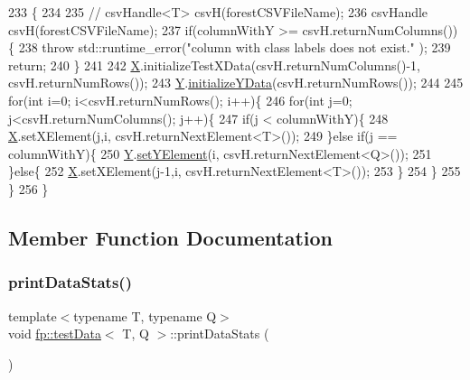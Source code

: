 \begin{DoxyCode}
233         \{
234 
235             \textcolor{comment}{//          csvHandle<T> csvH(forestCSVFileName);}
236             csvHandle csvH(forestCSVFileName);
237             \textcolor{keywordflow}{if}(columnWithY >= csvH.returnNumColumns())\{
238                 \textcolor{keywordflow}{throw} std::runtime\_error(\textcolor{stringliteral}{"column with class labels does not exist."} );
239                 \textcolor{keywordflow}{return};
240             \}
241 
242             \hyperlink{classfp_1_1testData_ad85120d23de2f6c10d6e9455e5f5adb9}{X}.initializeTestXData(csvH.returnNumColumns()-1, csvH.returnNumRows());
243             \hyperlink{classfp_1_1testData_a9421a63841491860ddeeb1f7fa0d4219}{Y}.\hyperlink{classfp_1_1inputYData_a9bb60b2b0070ae39ad53088f1bcf9e87}{initializeYData}(csvH.returnNumRows());
244 
245             \textcolor{keywordflow}{for}(\textcolor{keywordtype}{int} i=0; i<csvH.returnNumRows(); i++)\{
246                 \textcolor{keywordflow}{for}(\textcolor{keywordtype}{int} j=0; j<csvH.returnNumColumns(); j++)\{
247                     \textcolor{keywordflow}{if}(j < columnWithY)\{
248                         \hyperlink{classfp_1_1testData_ad85120d23de2f6c10d6e9455e5f5adb9}{X}.setXElement(j,i, csvH.returnNextElement<T>());
249                     \}\textcolor{keywordflow}{else} \textcolor{keywordflow}{if}(j == columnWithY)\{
250                         \hyperlink{classfp_1_1testData_a9421a63841491860ddeeb1f7fa0d4219}{Y}.\hyperlink{classfp_1_1inputYDataClassification_a421b4107615668eebf7bf447fb99ecc5}{setYElement}(i, csvH.returnNextElement<Q>());
251                     \}\textcolor{keywordflow}{else}\{
252                         \hyperlink{classfp_1_1testData_ad85120d23de2f6c10d6e9455e5f5adb9}{X}.setXElement(j-1,i, csvH.returnNextElement<T>());
253                     \}
254                 \}
255             \}
256         \}
\end{DoxyCode}


\subsection{Member Function Documentation}
\mbox{\label{classfp_1_1testData_ae9f03130f5c189e7469ac634a2e897c5}} 
\subsubsection{\texorpdfstring{print\+Data\+Stats()}{printDataStats()}}
{\footnotesize\ttfamily template$<$typename T, typename Q$>$ \\
void \hyperlink{classfp_1_1testData}{fp\+::test\+Data}$<$ T, Q $>$\+::print\+Data\+Stats (\begin{DoxyParamCaption}{ }\end{DoxyParamCaption})\hspace{0.3cm}{\ttfamily [inline]}}



